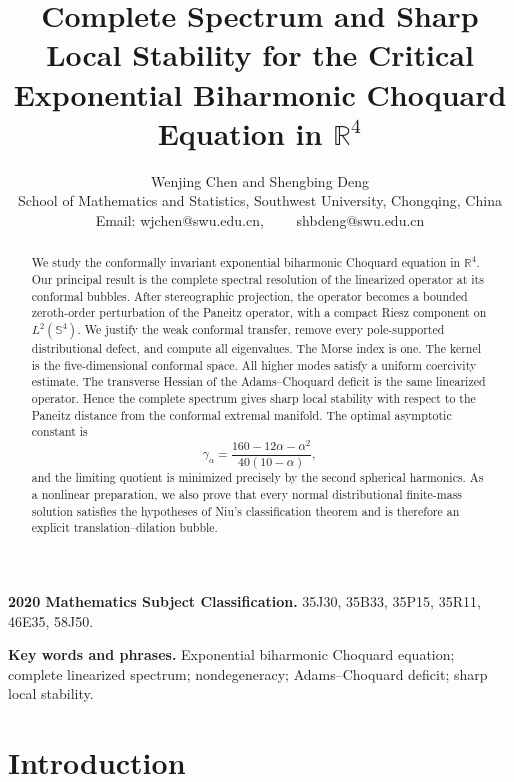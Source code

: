 \documentclass[11pt]{article}
\numberwithin{equation}{section}
\begin{document}
\title{Complete Spectrum and Sharp Local Stability for the Critical Exponential Biharmonic Choquard Equation in \(\mathbb R^{4}\)}

\author{Wenjing Chen and Shengbing Deng\\
School of Mathematics and Statistics, Southwest University, Chongqing, China\\
Email: wjchen@swu.edu.cn, \ \ \ \ shbdeng@swu.edu.cn\\
}

\date{}

\maketitle

\begin{abstract}
We study the conformally invariant exponential biharmonic Choquard equation in
\(\mathbb R^{4}\). Our principal result is the complete spectral resolution of
the linearized operator at its conformal bubbles. After stereographic
projection, the operator becomes a bounded zeroth-order perturbation of the
Paneitz operator, with a compact Riesz component on
\(L^{2}(\mathbb S^{4})\). We justify the weak conformal transfer, remove every
pole-supported distributional defect, and compute all eigenvalues. The Morse
index is one. The kernel is the five-dimensional conformal space. All higher
modes satisfy a uniform coercivity estimate. The transverse Hessian of the
Adams--Choquard deficit is the same linearized operator. Hence the complete
spectrum gives sharp local stability with respect to the Paneitz distance from
the conformal extremal manifold. The optimal asymptotic constant is
\[
\gamma_{\alpha}
=\frac{160-12\alpha-\alpha^{2}}{40(10-\alpha)},
\]
and the limiting quotient is minimized precisely by the second spherical
harmonics. As a nonlinear preparation, we also prove that every normal
distributional finite-mass solution satisfies the hypotheses of Niu's
classification theorem and is therefore an explicit translation--dilation
bubble.
\end{abstract}

\noindent\textbf{2020 Mathematics Subject Classification.}
35J30, 35B33, 35P15, 35R11, 46E35, 58J50.

\noindent\textbf{Key words and phrases.}
Exponential biharmonic Choquard equation; complete linearized spectrum; nondegeneracy; Adams--Choquard deficit; sharp local stability.

\section{Introduction}
\end{document}
